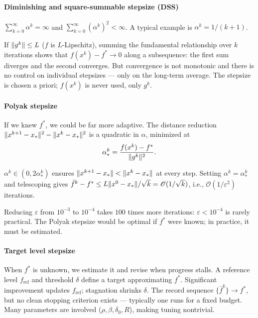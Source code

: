 \paragraph{Diminishing and square-summable stepsize (DSS)}

\begin{defn}\label{def:dss}
	$\sum_{k=0}^{\infty} \alpha^k = \infty$ and $\sum_{k=0}^{\infty} (\alpha^k)^2 < \infty$.
	A typical example is $\alpha^k = 1/(k+1)$.
\end{defn}

If $\lVert g^k\rVert \leq L$ ($f$ is $L$-Lipschitz), summing the fundamental relationship over $k$ iterations shows that $f(x^k) - f^* \to 0$ along a subsequence: the first sum diverges and the second converges.
But convergence is not monotonic and there is no control on individual stepsizes --- only on the long-term average.
The stepsize is chosen a priori; $f(x^k)$ is never used, only $g^k$.

\paragraph{Polyak stepsize}

If we knew $f^*$, we could be far more adaptive.
The distance reduction $\lVert x^{k+1} - x_*\rVert^2 - \lVert x^k - x_*\rVert^2$ is a quadratic in $\alpha$, minimized at
\begin{equation}\label{eq:polyak-stepsize}
	\alpha^k_* = \frac{f(x^k) - f^*}{\lVert g^k\rVert^2}.
\end{equation}

\begin{defn}\label{def:polyak}
	$\alpha^k \in (0, 2\alpha^k_*)$ ensures $\lVert x^{k+1} - x_*\rVert < \lVert x^k - x_*\rVert$ at every step.
	Setting $\alpha^k = \alpha^k_*$ and telescoping gives
	$\bar{f}^k - f^* \leq L\lVert x^0 - x_*\rVert/\sqrt{k} = \mathcal{O}(1/\sqrt{k})$,
	i.e., $\mathcal{O}(1/\varepsilon^2)$ iterations.
\end{defn}

Reducing $\varepsilon$ from $10^{-3}$ to $10^{-4}$ takes $100$ times more iterations: $\varepsilon < 10^{-4}$ is rarely practical.
The Polyak stepsize would be optimal if $f^*$ were known; in practice, it must be estimated.

\paragraph{Target level stepsize}

When $f^*$ is unknown, we estimate it and revise when progress stalls.
A reference level $f_{\mathrm{ref}}$ and threshold $\delta$ define a target approximating $f^*$.
Significant improvement updates $f_{\mathrm{ref}}$; stagnation shrinks $\delta$.
The record sequence $\{\bar{f}^k\} \to f^*$, but no clean stopping criterion exists --- typically one runs for a fixed budget.
Many parameters are involved ($\rho, \beta, \delta_0, R$), making tuning nontrivial.

